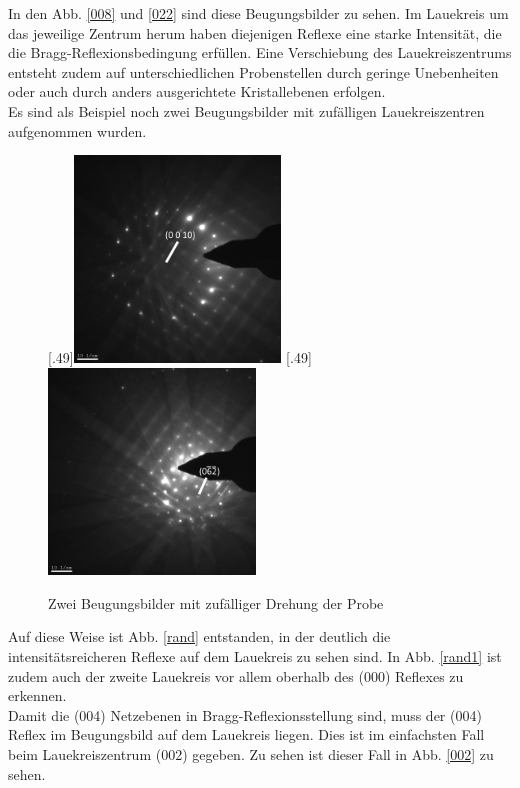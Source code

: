 \documentclass[a4paper,11pt,DIV=11]{scrartcl}
\begin{document}
In den Abb. \ref{008} und \ref{022} sind diese Beugungsbilder zu sehen. Im Lauekreis um das jeweilige Zentrum herum haben diejenigen Reflexe eine starke Intensität, die die Bragg-Reflexionsbedingung erfüllen. Eine Verschiebung des Lauekreiszentrums entsteht zudem auf unterschiedlichen Probenstellen durch geringe Unebenheiten oder auch durch anders ausgerichtete Kristallebenen erfolgen. \\
Es sind als Beispiel noch zwei Beugungsbilder mit zufälligen Lauekreiszentren aufgenommen wurden.

\begin{figure}[htb]\centering
	[.49\linewidth]{\includegraphics[width=0.49\textwidth]{Versuchsdaten/9/RandomTilt.jpg}}
	[.49\linewidth]{\includegraphics[width=0.49\textwidth]{Versuchsdaten/9/RandomTilt1.jpg}}\\
	\caption{Zwei Beugungsbilder mit zufälliger Drehung der Probe} \label{rands}
\end{figure}

Auf diese Weise ist Abb. \ref{rand} entstanden, in der deutlich die intensitätsreicheren Reflexe auf dem Lauekreis zu sehen sind. In Abb. \ref{rand1} ist zudem auch der zweite Lauekreis vor allem oberhalb des (000) Reflexes zu erkennen. \\
Damit die (004) Netzebenen in Bragg-Reflexionsstellung sind, muss der (004) Reflex im Beugungsbild auf dem Lauekreis liegen. Dies ist im einfachsten Fall beim Lauekreiszentrum (002) gegeben. Zu sehen ist dieser Fall in Abb. \ref{002} zu sehen.
\end{document}
